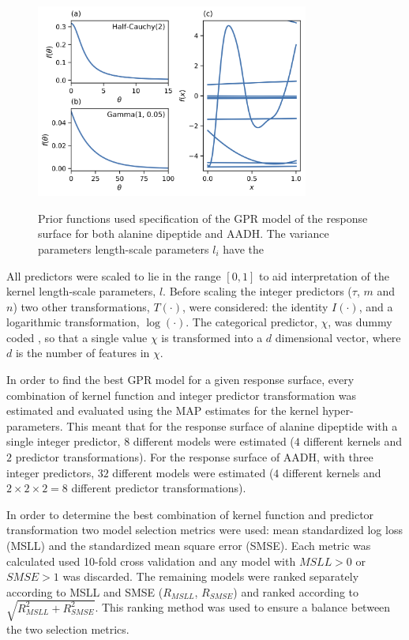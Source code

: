 \begin{figure}
    \centering
    \caption{Prior functions used specification of the GPR model of the response surface for both alanine dipeptide and AADH. The variance parameters  length-scale parameters $l_{i}$ have the }
    \includegraphics[width=0.8\textwidth]{chapters/msm_optimization/figures/prior_functions.png}
    \label{fig:priors}
\end{figure}

All predictors were scaled to lie in the range $[0, 1]$ to aid interpretation of the kernel length-scale parameters, $l$. Before scaling the integer predictors ($\tau$, $m$ and $n$) two other transformations, $T(\cdot)$, were considered: the identity $I(\cdot)$, and a logarithmic transformation, $\log(\cdot)$. The categorical predictor, $\chi$, was dummy coded \cite{dalyDummyCodingVs2016}, so that a single value $\chi$ is transformed into a $d$ dimensional vector, where $d$ is the number of features in $\chi$.

In order to find the best GPR model for a given response surface, every combination of kernel function and integer predictor transformation was estimated and evaluated using the MAP estimates for the kernel hyper-parameters. This meant that for the response surface of alanine dipeptide with a single integer predictor, $8$ different models were estimated ($4$ different kernels and $2$ predictor transformations). For the response surface of AADH, with three integer predictors, $32$ different models were estimated ($4$ different kernels and $2\times2\times2=8$ different predictor transformations). 

In order to determine the best combination of kernel function and predictor transformation two model selection metrics were used:  mean standardized log loss (MSLL) and the standardized mean square error (SMSE). Each metric was calculated used 10-fold cross validation and any model with $MSLL > 0$ or $SMSE > 1$ was discarded. The remaining models were ranked separately according to MSLL and SMSE ($R_{MSLL}$, $R_{SMSE}$) and ranked according to $\sqrt{R_{MSLL}^2 + R_{SMSE}^2}$. This ranking method was used to ensure a balance between the two selection metrics. 

